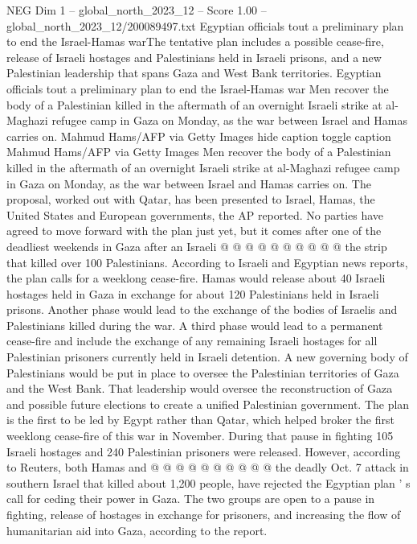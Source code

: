 \begin{textsample}{NEG Dim 1 – global\_north\_2023\_12 – Score 1.00 – global\_north\_2023\_12/200089497.txt}  \label{ex:f1_neg_201}
Egyptian officials tout a preliminary plan to end the Israel-Hamas warThe tentative plan includes a possible cease-fire, release of Israeli hostages and Palestinians held in Israeli prisons, and a new Palestinian leadership that spans Gaza and West Bank territories.
Egyptian officials tout a preliminary plan to end the Israel-Hamas war Men recover the body of a Palestinian killed in the aftermath of an overnight Israeli strike at al-Maghazi refugee camp in Gaza on Monday, as the war between Israel and Hamas carries on.
Mahmud Hams/AFP via Getty Images hide caption toggle caption Mahmud Hams/AFP via Getty Images Men recover the body of a Palestinian killed in the aftermath of an overnight Israeli strike at al-Maghazi refugee camp in Gaza on Monday, as the war between Israel and Hamas carries on.
The proposal, worked out with Qatar, has been presented to Israel, Hamas, the United States and European governments, the AP reported.
No parties have agreed to move forward with the plan just yet, but it comes after one of the deadliest weekends in Gaza after an Israeli @ @ @ @ @ @ @ @ @ @ the strip that killed over 100 Palestinians.
According to Israeli and Egyptian news reports, the plan calls for a weeklong cease-fire.
Hamas would release about 40 Israeli hostages held in Gaza in exchange for about 120 Palestinians held in Israeli prisons.
Another phase would lead to the exchange of the bodies of Israelis and Palestinians killed during the war.
A third phase would lead to a permanent cease-fire and include the exchange of any remaining Israeli hostages for all Palestinian prisoners currently held in Israeli detention.
A new governing body of Palestinians would be put in place to oversee the Palestinian territories of Gaza and the West Bank.
That leadership would oversee the reconstruction of Gaza and possible future elections to create a unified Palestinian government.
The plan is the first to be led by Egypt rather than Qatar, which helped broker the first weeklong cease-fire of this war in November.
During that pause in fighting 105 Israeli hostages and 240 Palestinian prisoners were released.
However, according to Reuters, both Hamas and @ @ @ @ @ @ @ @ @ @ the deadly Oct. 7 attack in southern Israel that killed about 1,200 people, have rejected the Egyptian plan ' s call for ceding their power in Gaza.
The two groups are open to a pause in fighting, release of hostages in exchange for prisoners, and increasing the flow of humanitarian aid into Gaza, according to the report.

\end{textsample}
